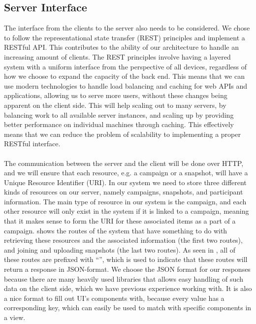 \subsection{Server Interface}
\label{sub:server_interface}
The interface from the clients to the server also needs to be considered. We chose to follow the representational state transfer (REST) principles \parencite{http_manden} and implement a RESTful API. This contributes to the ability of our architecture to handle an increasing amount of clients. The REST principles involve having a layered system with a uniform interface from the perspective of all devices, regardless of how we choose to expand the capacity of the back end. This means that we can use modern technologies to handle load balancing and caching for web APIs and applications, allowing us to serve more users, without these changes being apparent on the client side. This will help scaling out to many servers, by balancing work to all available server instances, and scaling up by providing better performance on individual machines through caching. This effectively means that we can reduce the problem of scalability to implementing a proper RESTful interface. 
\\\\
The communication between the server and the client will be done over HTTP, and we will ensure that each resource, e.g. a campaign or a snapshot, will have a Unique Resource Identifier (URI). In our system we need to store three different kinds of resources on our server, namely campaigns, snapshots, and participant information. The main type of resource in our system is the campaign, and each other resource will only exist in the system if it is linked to a campaign, meaning that it makes sense to form the URI for these associated items as a part of a campaign.  shows the routes of the system that have something to do with retrieving these resources and the associated information (the first two routes), and joining and uploading snapshots (the last two routes). As seen in , all of these routes are prefixed with ``'', which is used to indicate that these routes will return a response in JSON-format. We choose the JSON format for our responses because there are many heavily used libraries that allows easy handling of such data on the client side, which we have previous experience working with. It is also a nice format to fill out UI's components with, because every value has a corresponding key, which can easily be used to match with specific components in a view. 

